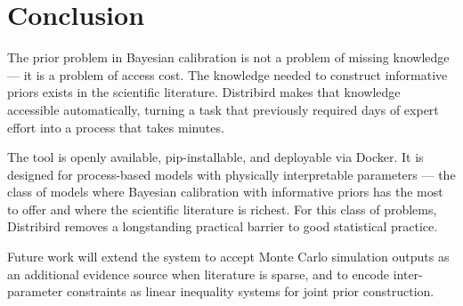 \documentclass[11pt,a4paper]{article}
\begin{document}
\section{Conclusion}
\label{sec:conclusion}

The prior problem in Bayesian calibration is not a problem of missing knowledge --- it is a
problem of access cost. The knowledge needed to construct informative priors exists in the
scientific literature. Distribird makes that knowledge accessible automatically, turning a task that
previously required days of expert effort into a process that takes minutes.

The tool is openly available, pip-installable, and deployable via Docker. It is designed for
process-based models with physically interpretable parameters --- the class of models where
Bayesian calibration with informative priors has the most to offer and where the scientific
literature is richest. For this class of problems, Distribird removes a longstanding practical
barrier to good statistical practice.

Future work will extend the system to accept Monte Carlo simulation outputs as an additional
evidence source when literature is sparse, and to encode inter-parameter constraints as linear
inequality systems for joint prior construction.


\end{document}
